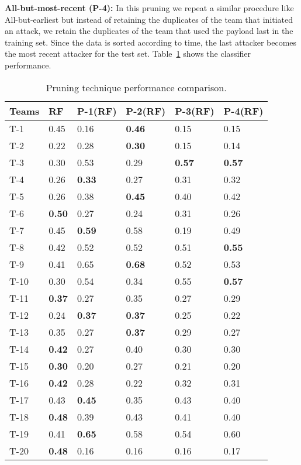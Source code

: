\documentclass[conference]{IEEEtran}
\begin{document}
\noindent\textbf{All-but-most-recent (P-4):}
In this pruning we repeat a similar procedure like All-but-earliest but instead of retaining the duplicates of the team that initiated an attack, we retain the duplicates of the team that used the payload last in the training set. Since the data is sorted according to time, the last attacker becomes the most recent attacker for the test set. Table~\ref{teams} shows the classifier performance.

\begin{table}[h!]
	\caption{\textmd{Pruning technique performance comparison.}}
	\label{teams}
	\centering
	\tiny
	\renewcommand{\arraystretch}{1.5}
	
	\begin{tabular}{|p{0.7cm}|p{0.7cm}|p{0.7cm}|p{0.7cm}|p{0.7cm}|p{0.7cm}|} 
		\hline
		{\bf Teams} &  {\bf RF} &  {\bf P-1(RF)} &  {\bf P-2(RF)} &  {\bf P-3(RF)} &  {\bf P-4(RF)} \\ \hline 
	
		\textsf{T-1} & 0.45 & 0.16 & \textbf{0.46} & 0.15 & 0.15\\ 
		\textsf{T-2} & 0.22 & 0.28 & \textbf{0.30} & 0.15 & 0.14\\ 
		\textsf{T-3} & 0.30 & 0.53 & 0.29 & \textbf{0.57} & \textbf{0.57}\\ 
		\textsf{T-4} & 0.26 & \textbf{0.33} & 0.27 & 0.31 & 0.32\\ 
		\textsf{T-5} & 0.26 & 0.38 & \textbf{0.45} & 0.40 & 0.42\\ 
		\textsf{T-6} & \textbf{0.50}  & 0.27 & 0.24 & 0.31 & 0.26\\ 
		\textsf{T-7} & 0.45 & \textbf{0.59} & 0.58 & 0.19 & 0.49\\ 
		\textsf{T-8} & 0.42 & 0.52 & 0.52 & 0.51 & \textbf{0.55}\\ 
		\textsf{T-9} & 0.41 & 0.65 & \textbf{0.68} & 0.52 & 0.53\\ 
		\textsf{T-10} & 0.30 & 0.54 & 0.34 & 0.55 & \textbf{0.57}\\ 
		\textsf{T-11} & \textbf{0.37} & 0.27 & 0.35 & 0.27 & 0.29\\ 
		\textsf{T-12} & 0.24 & \textbf{0.37 }& \textbf{0.37} & 0.25 & 0.22\\ 
		\textsf{T-13} & 0.35 & 0.27 & \textbf{0.37} & 0.29 & 0.27\\ 
		\textsf{T-14} & \textbf{0.42} & 0.27 & 0.40 & 0.30 & 0.30\\ 
		\textsf{T-15} & \textbf{0.30} & 0.20 & 0.27 & 0.21 & 0.20\\ 
		\textsf{T-16} & \textbf{0.42} & 0.28 & 0.22 & 0.32 & 0.31\\ 
		\textsf{T-17} & 0.43 & \textbf{0.45} & 0.35 & 0.43 & 0.40\\ 
		\textsf{T-18} & \textbf{0.48} & 0.39 & 0.43 & 0.41 & 0.40\\ 
		\textsf{T-19} & 0.41 & \textbf{0.65} & 0.58 & 0.54 & 0.60\\ 
		\textsf{T-20} & \textbf{0.48} & 0.16 & 0.16 & 0.16 & 0.17\\ 
		\hline
	\end{tabular}
	\vspace{-1em}
	
\end{table}
\end{document}
